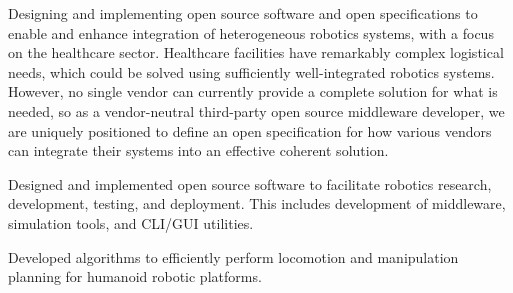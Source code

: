 \documentclass[10pt,a4paper,ragged2e]{altacv}
\begin{document}

\begin{fullwidth}
\makecvheader
\end{fullwidth}



Designing and implementing open source software and open specifications to enable and enhance integration of heterogeneous robotics systems, with a focus on the healthcare sector. Healthcare facilities have remarkably complex logistical needs, which could be solved using sufficiently well-integrated robotics systems. However, no single vendor can currently provide a complete solution for what is needed, so as a vendor-neutral third-party open source middleware developer, we are uniquely positioned to define an open specification for how various vendors can integrate their systems into an effective coherent solution. 

\divider

Designed and implemented open source software to facilitate robotics research, development, testing, and deployment. This includes development of middleware, simulation tools, and CLI/GUI utilities.

\divider

Developed algorithms to efficiently perform locomotion and manipulation planning for humanoid robotic platforms.
\end{document}
